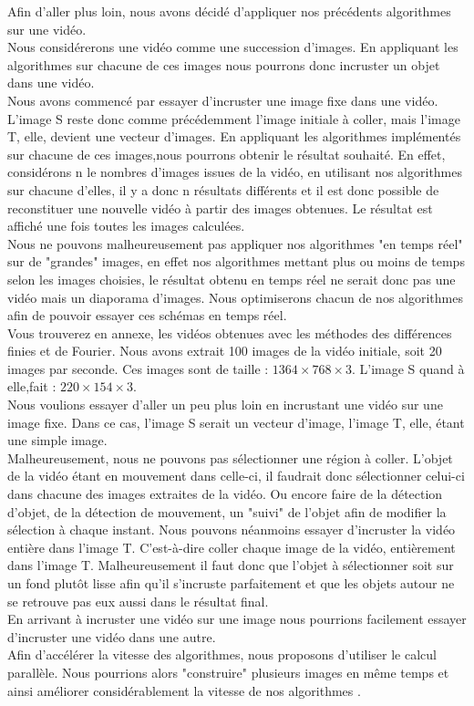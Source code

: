 Afin d'aller plus loin, nous avons décidé d'appliquer nos précédents algorithmes sur une vidéo. \\
Nous considérerons une vidéo comme une succession d'images. En appliquant les algorithmes sur chacune de ces images nous pourrons donc incruster un objet dans une vidéo. \\
Nous avons commencé par essayer d'incruster une image fixe dans une vidéo. 
L'image S reste donc comme précédemment l'image initiale à coller, mais l'image T, elle, devient une vecteur d'images. En appliquant les algorithmes implémentés sur chacune de ces images,nous pourrons obtenir le résultat souhaité. En effet, considérons n le nombres d'images issues de la vidéo, en utilisant nos algorithmes sur chacune d'elles, il y a donc n résultats différents et il est donc possible de reconstituer une nouvelle vidéo à partir des images obtenues.  Le résultat est affiché une fois toutes les images calculées. \\ 
Nous ne pouvons malheureusement pas appliquer nos algorithmes "en temps réel" sur de "grandes" images, en effet nos algorithmes mettant plus ou moins de temps selon les images choisies, le résultat obtenu en temps réel ne serait donc pas une vidéo mais un diaporama d'images. Nous optimiserons chacun de nos algorithmes afin de pouvoir essayer ces schémas en temps réel. \\
Vous trouverez en annexe, les vidéos obtenues avec les méthodes des différences finies et de Fourier. 
Nous avons extrait 100 images de la vidéo initiale, soit 20 images par seconde. Ces images sont de taille : $1364 \times 768 \times 3$.  L'image S quand à elle,fait : $220 \times 154 \times 3$.\\
Nous voulions essayer d'aller un peu plus loin en incrustant une vidéo sur une image fixe. Dans ce cas, l'image S serait un vecteur d'image, l'image T, elle, étant une simple image. \\ Malheureusement, nous ne pouvons pas sélectionner une région à coller. L'objet de la vidéo étant en mouvement dans celle-ci, il faudrait donc sélectionner celui-ci dans chacune des images extraites de la vidéo. Ou encore faire de la détection d'objet, de la détection de mouvement, un "suivi" de l'objet afin de modifier la sélection à chaque instant. Nous pouvons néanmoins essayer d'incruster la vidéo entière dans l'image T.  C'est-à-dire coller chaque image de la vidéo, entièrement dans l'image T. Malheureusement il faut donc que l'objet à sélectionner soit sur un fond plutôt lisse afin qu'il s'incruste parfaitement et que les objets autour ne se retrouve pas eux aussi dans le résultat final. \\
En arrivant à incruster une vidéo sur une image nous pourrions facilement essayer d'incruster une vidéo dans une autre. \\
Afin d'accélérer la vitesse des algorithmes, nous proposons d'utiliser le calcul parallèle. Nous pourrions alors "construire" plusieurs images en même temps et ainsi améliorer considérablement la vitesse de nos algorithmes .\\
